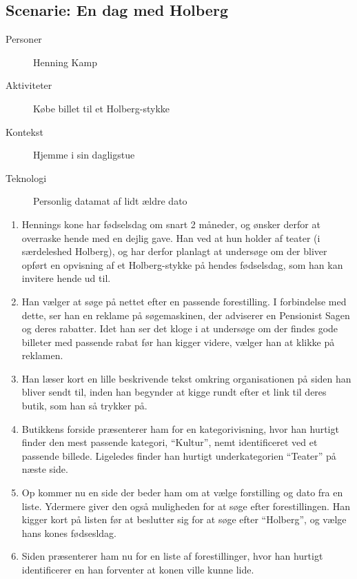\subsection{Scenarie: En dag med Holberg}

\begin{description}
    \item[Personer] Henning Kamp
    \item[Aktiviteter] Købe billet til et Holberg-stykke
    \item[Kontekst] Hjemme i sin dagligstue
    \item[Teknologi] Personlig datamat af lidt ældre dato
\end{description}

\begin{enumerate}
    \item {
        Hennings kone har fødselsdag om snart 2 måneder, og ønsker derfor at overraske hende med en dejlig gave. Han ved at hun holder af teater (i særdeleshed Holberg), og har derfor planlagt at undersøge om der bliver opført en opvisning af et Holberg-stykke på hendes fødselsdag, som han kan invitere hende ud til.
    }
    \item {
        Han vælger at søge på nettet efter en passende forestilling. I forbindelse med dette, ser han en reklame på søgemaskinen, der adviserer en Pensionist Sagen og deres rabatter. Idet han ser det kloge i at undersøge om der findes gode billeter med passende rabat før han kigger videre, vælger han at klikke på reklamen. 
    }
    \item {
        Han læser kort en lille beskrivende tekst omkring organisationen på siden han bliver sendt til, inden han begynder at kigge rundt efter et link til deres butik, som han så trykker på.
    }
    \item {
        Butikkens forside præsenterer ham for en kategorivisning, hvor han hurtigt finder den mest passende kategori, ``Kultur'', nemt identificeret ved et passende billede. Ligeledes finder han hurtigt underkategorien ``Teater'' på næste side.
    }
    \item {
        Op kommer nu en side der beder ham om at vælge forstilling og dato fra en liste. Ydermere giver den også muligheden for at søge efter forestillingen. Han kigger kort på listen før at beslutter sig for at søge efter ``Holberg'', og vælge hans kones fødsesldag.
    }
    \item {
        Siden præsenterer ham nu for en liste af forestillinger, hvor han hurtigt identificerer en han forventer at konen ville kunne lide.
}
\end{enumerate}
